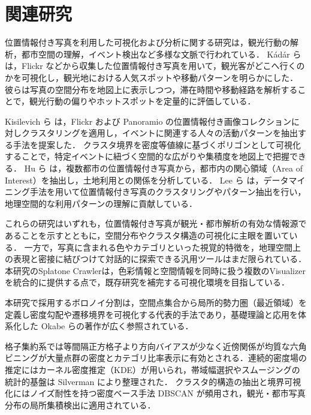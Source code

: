 \documentclass[11pt,a4paper]{jlreq}
\begin{document}
\section{関連研究}
\label{sec:related}
位置情報付き写真を利用した可視化および分析に関する研究は，観光行動の解析，都市空間の理解，イベント検出など多様な文脈で行われている．
K{\'a}d{\'a}r ら\cite{kadar2013wheredotouristsgo} は，Flickr などから収集した位置情報付き写真を用いて，観光客がどこへ行くのかを可視化し，観光地における人気スポットや移動パターンを明らかにした．
彼らは写真の空間分布を地図上に表示しつつ，滞在時間や移動経路を解析することで，観光行動の偏りやホットスポットを定量的に評価している．

Kisilevich ら\cite{kisilevich2010eventbased} は，Flickr および Panoramio の位置情報付き画像コレクションに対しクラスタリングを適用し，イベントに関連する人々の活動パターンを抽出する手法を提案した．
クラスタ境界を密度等値線に基づくポリゴンとして可視化することで，特定イベントに紐づく空間的な広がりや集積度を地図上で把握できる．
Hu ら\cite{hu2015extractingAOI} は，複数都市の位置情報付き写真から，都市内の関心領域（Area of Interest）を抽出し，土地利用との関係を分析している．
Lee ら\cite{lee2014exploration} は，データマイニング手法を用いて位置情報付き写真のクラスタリングやパターン抽出を行い，地理空間的な利用パターンの理解に貢献している．

これらの研究はいずれも，位置情報付き写真が観光・都市解析の有効な情報源であることを示すとともに，空間分布やクラスタ構造の可視化に主眼を置いている．
一方で，写真に含まれる色やカテゴリといった視覚的特徴を，地理空間上の表現と密接に結びつけて対話的に探索できる汎用ツールはまだ限られている．
本研究のSplatone Crawlerは，色彩情報と空間情報を同時に扱う複数のVisualizerを統合的に提供する点で，既存研究を補完する可視化環境を目指している．

本研究で採用するボロノイ分割は，空間点集合から局所的勢力圏（最近領域）を定義し密度勾配や遷移境界を可視化する代表的手法であり，基礎理論と応用を体系化した Okabe らの著作\cite{okabe2000spatial}が広く参照されている．

格子集約系では等間隔正方格子より方向バイアスが少なく近傍関係が均質な六角ビニング\cite{carr1987hexbin}が大量点群の密度とカテゴリ比率表示に有効とされる．連続的密度場の推定にはカーネル密度推定（KDE）が用いられ，帯域幅選択やスムージングの統計的基盤は Silverman\cite{silverman1986density} により整理された．
クラスタ的構造の抽出と境界可視化にはノイズ耐性を持つ密度ベース手法 DBSCAN\cite{ester1996dbscan} が頻用され，観光・都市写真分布の局所集積検出に適用されている．
\end{document}
